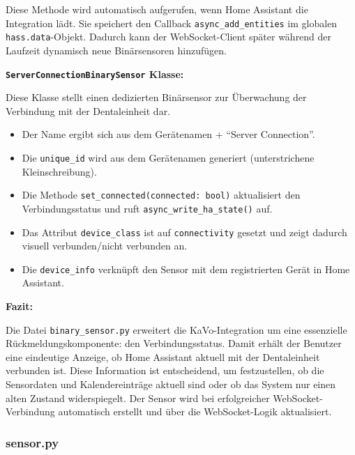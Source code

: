Diese Methode wird automatisch aufgerufen, wenn Home Assistant die Integration lädt. Sie speichert den Callback \texttt{async\_add\_entities} im globalen \texttt{hass.data}-Objekt. Dadurch kann der WebSocket-Client später während der Laufzeit dynamisch neue Binärsensoren hinzufügen.

\vspace{0.5cm}

\textbf{\texttt{ServerConnectionBinarySensor} Klasse:}

Diese Klasse stellt einen dedizierten Binärsensor zur Überwachung der Verbindung mit der Dentaleinheit dar.

\begin{itemize}
  \item Der Name ergibt sich aus dem Gerätenamen + \enquote{Server Connection}.\\
  \item Die \texttt{unique\_id} wird aus dem Gerätenamen generiert (unterstrichene Kleinschreibung).\\
  \item Die Methode \texttt{set\_connected(connected: bool)} aktualisiert den Verbindungsstatus und ruft \texttt{async\_write\_ha\_state()} auf.\\
  \item Das Attribut \texttt{device\_class} ist auf \texttt{connectivity} gesetzt und zeigt dadurch visuell verbunden/nicht verbunden an.\\
  \item Die \texttt{device\_info} verknüpft den Sensor mit dem registrierten Gerät in Home Assistant.
\end{itemize}

\vspace{0.5cm}

\textbf{Fazit:}

Die Datei \texttt{binary\_sensor.py} erweitert die KaVo-Integration um eine essenzielle Rückmeldungskomponente: den Verbindungsstatus. Damit erhält der Benutzer eine eindeutige Anzeige, ob Home Assistant aktuell mit der Dentaleinheit verbunden ist. Diese Information ist entscheidend, um festzustellen, ob die Sensordaten und Kalendereinträge aktuell sind oder ob das System nur einen alten Zustand widerspiegelt. Der Sensor wird bei erfolgreicher WebSocket-Verbindung automatisch erstellt und über die WebSocket-Logik aktualisiert.

\subsubsection{sensor.py}

